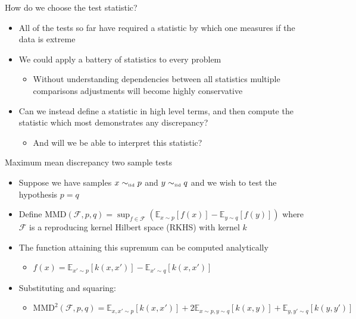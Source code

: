 \begin{frame}{How do we choose the test statistic?}
  \begin{itemize}
    \item All of the tests so far have required a statistic by which one measures if the data is extreme
    \vspace{\baselineskip}
    \pause
    \item We could apply a battery of statistics to every problem
    \begin{itemize}
      \item Without understanding dependencies between all statistics multiple comparisons adjustments will become highly conservative
    \end{itemize}
    \vspace{\baselineskip}
    \pause
    \item Can we instead define a statistic in high level terms, and then compute the statistic which most demonstrates any discrepancy?
    \pause
    \begin{itemize}
      \item And will we be able to interpret this statistic?
    \end{itemize}
  \end{itemize}
\end{frame}

\begin{frame}{Maximum mean discrepancy two sample tests}
  \begin{itemize}
    \item Suppose we have samples $x \sim_{\mbox{\tiny iid}} p$ and $y \sim_{\mbox{\tiny iid}} q$ and we wish to test the hypothesis $p = q$
    \vspace{\baselineskip}
    \pause
    \item Define $\textrm{MMD}(\mathcal{F},p,q) = \sup_{f \in \mathcal{F}}(\mathbb{E}_{x\sim p}[f(x)] - \mathbb{E}_{y\sim q}[f(y)])$ where $\mathcal{F}$ is a reproducing kernel Hilbert space (RKHS) with kernel $k$
    \vspace{\baselineskip}
    \pause
    \item The function attaining this supremum can be computed analytically
    \begin{itemize}
      \item $f(x) = \mathbb{E}_{x'\sim p}[k(x,x')] - \mathbb{E}_{x'\sim q}[k(x,x')]$
    \end{itemize}
    \vspace{\baselineskip}
    \pause
    \item Substituting and squaring:
    \begin{itemize}
		\item $\textrm{MMD}^2(\mathcal{F},p,q) = \mathbb{E}_{x,x'\sim p}[k(x,x')] + 2\mathbb{E}_{x\sim p,y\sim q}[k(x,y)] + \mathbb{E}_{y,y'\sim q}[k(y,y')]$
	\end{itemize}
  \end{itemize}
\end{frame}

